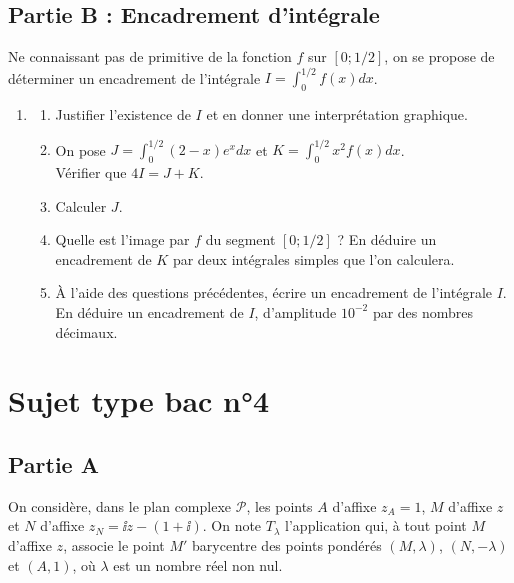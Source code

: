\subsection*{Partie B : Encadrement d'intégrale}
Ne connaissant pas de primitive de la fonction $f$ sur $[0; 1/2]$, on se propose de déterminer un encadrement de l'intégrale $I = \int_0^{1/2} f(x) dx$.
\begin{enumerate}
	\item \begin{enumerate}
		\item Justifier l'existence de $I$ et en donner une interprétation graphique.
		\item On pose $J = \int_0^{1/2} (2-x)e^x dx$ et $K = \int_0^{1/2} x^2 f(x) dx$. \\
		Vérifier que $4I = J + K$.
		\item Calculer $J$.
		\item Quelle est l'image par $f$ du segment $[0; 1/2]$ ? En déduire un encadrement de $K$ par deux intégrales simples que l'on calculera.
		\item À l'aide des questions précédentes, écrire un encadrement de l'intégrale $I$. En déduire un encadrement de $I$, d'amplitude $10^{-2}$ par des nombres décimaux.
	\end{enumerate}
\end{enumerate}




\section*{Sujet type bac n°4}

\subsection*{Partie A}

On considère, dans le plan complexe $\mathscr{P}$, les points $A$ d'affixe $z_A = 1$,
$M$ d'affixe $z$ et $N$ d'affixe $z_N = \ii z - (1+\ii)$.
On note $T_\lambda$ l'application qui, à tout point $M$ d'affixe $z$, associe le point $M'$
barycentre des points pondérés $(M,\lambda)$, $(N,-\lambda)$ et $(A,1)$, où $\lambda$ est un nombre réel non nul.

